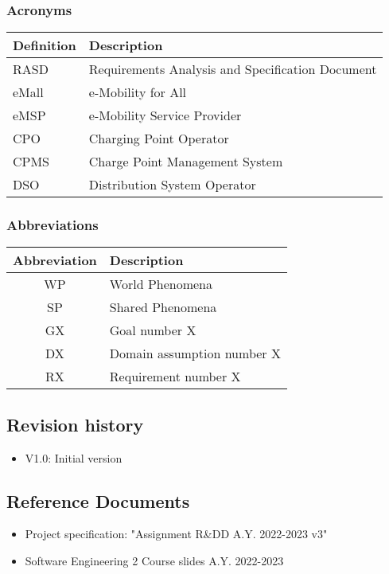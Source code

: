 \documentclass[../main.tex]{subfiles}
\begin{document}
\subsubsection{Acronyms}
\begin{center}
\begin{longtable}[\textwidth]{| l | l | } 
\hline
\textbf{Definition} & \textbf{Description} \\
\hline
RASD & Requirements Analysis and Specification Document \\
\hline
eMall & e-Mobility for All \\
\hline
eMSP & e-Mobility Service Provider \\
\hline
CPO & Charging Point Operator \\
\hline
CPMS & Charge Point Management System \\
\hline
DSO & Distribution System Operator \\
\hline
\end{longtable}
\end{center}

\subsubsection{Abbreviations}
\begin{center}
\begin{tabular}{| c | l |} 
 \hline
 \textbf{Abbreviation} & \textbf{Description} \\
 \hline
 WP & World Phenomena \\
 \hline
 SP & Shared Phenomena \\
 \hline
 GX & Goal number X \\
 \hline
 DX & Domain assumption number X \\
 \hline
 RX & Requirement number X \\
 \hline

\end{tabular}
\end{center}


\subsection{Revision history}
\begin{itemize}
    \item V1.0: Initial version
\end{itemize}


\subsection{Reference Documents}
\begin{itemize}
    \item Project specification: "Assignment R\&DD A.Y. 2022-2023 v3"
    \item Software Engineering 2 Course slides A.Y. 2022-2023
\end{itemize}
\end{document}
